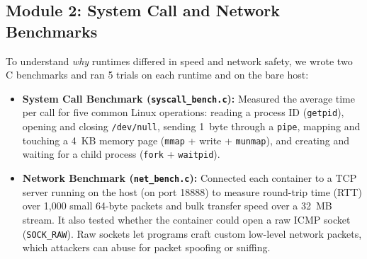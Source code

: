 \documentclass[conference]{IEEEtran}
\begin{document}
\subsection{Module 2: System Call and Network Benchmarks}
To understand \textit{why} runtimes differed in speed and network safety, we wrote two C benchmarks and ran 5 trials on each runtime and on the bare host:
\begin{itemize}
    \item \textbf{System Call Benchmark (\texttt{syscall\_bench.c}):} Measured the average time per call for five common Linux operations: reading a process ID (\texttt{getpid}), opening and closing \texttt{/dev/null}, sending 1~byte through a \texttt{pipe}, mapping and touching a 4~KB memory page (\texttt{mmap} + write + \texttt{munmap}), and creating and waiting for a child process (\texttt{fork} + \texttt{waitpid}).
    \item \textbf{Network Benchmark (\texttt{net\_bench.c}):} Connected each container to a TCP server running on the host (on port 18888) to measure round-trip time (RTT) over 1,000 small 64-byte packets and bulk transfer speed over a 32~MB stream. It also tested whether the container could open a raw ICMP socket (\texttt{SOCK\_RAW}). Raw sockets let programs craft custom low-level network packets, which attackers can abuse for packet spoofing or sniffing.
\end{itemize}
\end{document}
